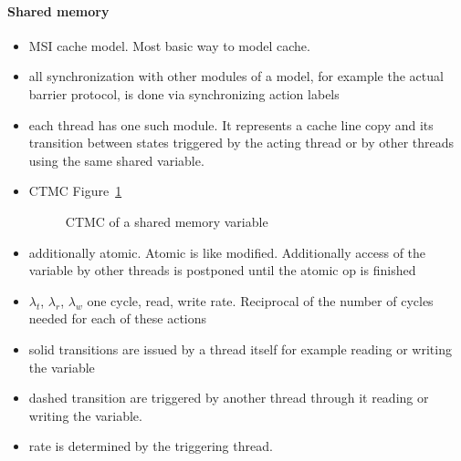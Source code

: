 \documentclass[a4paper, 10pt]{article}
\begin{document}
\begin{enumerate}
\paragraph{Shared memory}
\label{sssec:analysis-modelchecking-modelling-shared-memory}
\begin{itemize}
	\item MSI cache model. Most basic way to model cache.
	\item all synchronization with other modules of a model, for example the actual barrier protocol, is done via synchronizing action labels
	\item each thread has one such module. It represents a cache line copy and its transition between states triggered by the acting thread or by other threads using the same shared variable.
	\item CTMC Figure~\ref{fig:shared-memory-control-flow}
		\begin{figure}[htbp]
			\centering
			
			\caption{CTMC of a shared memory variable}
			\label{fig:shared-memory-control-flow}
		\end{figure}
	\item additionally atomic. Atomic is like modified. Additionally access of the variable by other threads is postponed until the atomic op is finished
	\item $\lambda_t$, $\lambda_r$, $\lambda_w$ one cycle, read, write rate. Reciprocal of the number of cycles needed for each of these actions
	\item solid transitions are issued by a thread itself for example reading or writing the variable
	\item dashed transition are triggered by another thread through it reading or writing the variable.
	\item rate is determined by the triggering thread.
\end{itemize}


\end{enumerate}
\end{document}
